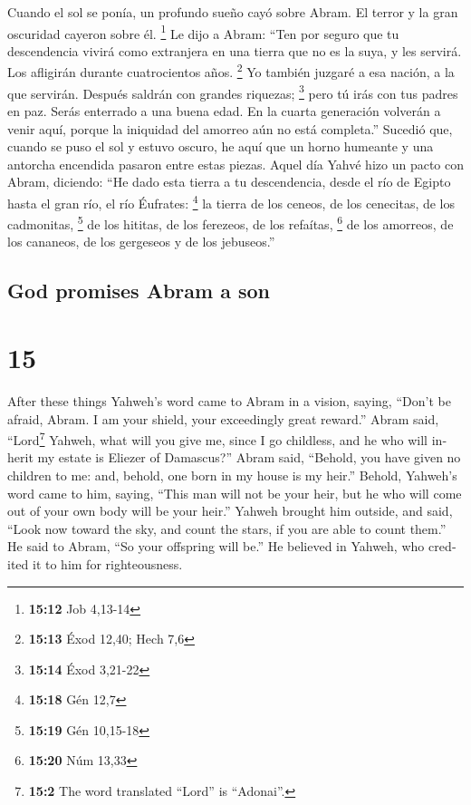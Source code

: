 \begin{paracol}{2}
 Cuando el sol se ponía, un profundo sueño cayó sobre
Abram. El terror y la gran oscuridad cayeron sobre él. \footnote{\textbf{15:12}
  Job 4,13-14}  Le dijo a Abram: ``Ten por seguro que tu
descendencia vivirá como extranjera en una tierra que no es la suya, y
les servirá. Los afligirán durante cuatrocientos años. \footnote{\textbf{15:13}
  Éxod 12,40; Hech 7,6}  Yo también juzgaré a esa nación,
a la que servirán. Después saldrán con grandes riquezas; \footnote{\textbf{15:14}
  Éxod 3,21-22}  pero tú irás con tus padres en paz.
Serás enterrado a una buena edad.  En la cuarta
generación volverán a venir aquí, porque la iniquidad del amorreo aún no
está completa.''  Sucedió que, cuando se puso el sol y
estuvo oscuro, he aquí que un horno humeante y una antorcha encendida
pasaron entre estas piezas.  Aquel día Yahvé hizo un
pacto con Abram, diciendo: ``He dado esta tierra a tu descendencia,
desde el río de Egipto hasta el gran río, el río Éufrates: \footnote{\textbf{15:18}
  Gén 12,7}  la tierra de los ceneos, de los cenecitas,
de los cadmonitas, \footnote{\textbf{15:19} Gén 10,15-18}
 de los hititas, de los ferezeos, de los refaítas,
\footnote{\textbf{15:20} Núm 13,33}  de los amorreos, de
los cananeos, de los gergeseos y de los jebuseos.''

\switchcolumn
\begin{otherlanguage}{english}

\hypertarget{god-promises-abram-a-son}{%
\subsection{God promises Abram a son}\label{god-promises-abram-a-son}}

\hypertarget{section-29}{%
\section{15}\label{section-29}}

 After these things Yahweh's word came to Abram in a
vision, saying, ``Don't be afraid, Abram. I am your shield, your
exceedingly great reward.''  Abram said, ``Lord\footnote{\textbf{15:2}
  The word translated ``Lord'' is ``Adonai''.} Yahweh, what will you
give me, since I go childless, and he who will inherit my estate is
Eliezer of Damascus?''  Abram said, ``Behold, you have
given no children to me: and, behold, one born in my house is my heir.''
 Behold, Yahweh's word came to him, saying, ``This man
will not be your heir, but he who will come out of your own body will be
your heir.''  Yahweh brought him outside, and said, ``Look
now toward the sky, and count the stars, if you are able to count
them.'' He said to Abram, ``So your offspring will be.'' 
He believed in Yahweh, who credited it to him for righteousness.


\end{otherlanguage}
\end{paracol}

